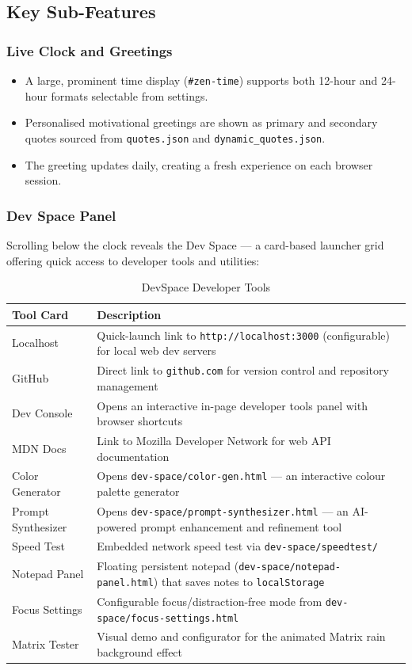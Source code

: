 \subsection{Key Sub-Features}

\subsubsection*{Live Clock and Greetings}
\begin{itemize}[leftmargin=*]
    \item A large, prominent time display (\texttt{\#zen-time}) supports both 12-hour and 24-hour formats selectable from settings.
    \item Personalised motivational greetings are shown as primary and secondary quotes sourced from \texttt{quotes.json} and \texttt{dynamic\_quotes.json}.
    \item The greeting updates daily, creating a fresh experience on each browser session.
\end{itemize}

\subsubsection*{Dev Space Panel}
Scrolling below the clock reveals the Dev Space — a card-based launcher grid offering quick access to developer tools and utilities:
\begin{longtable}{|p{4cm}|p{10cm}|}
\caption{DevSpace Developer Tools} \\
\hline
\textbf{Tool Card} & \textbf{Description} \\ \hline
\endhead
Localhost & Quick-launch link to \texttt{http://localhost:3000} (configurable) for local web dev servers \\ \hline
GitHub & Direct link to \texttt{github.com} for version control and repository management \\ \hline
Dev Console & Opens an interactive in-page developer tools panel with browser shortcuts \\ \hline
MDN Docs & Link to Mozilla Developer Network for web API documentation \\ \hline
Color Generator & Opens \texttt{dev-space/color-gen.html} — an interactive colour palette generator \\ \hline
Prompt Synthesizer & Opens \texttt{dev-space/prompt-synthesizer.html} — an AI-powered prompt enhancement and refinement tool \\ \hline
Speed Test & Embedded network speed test via \texttt{dev-space/speedtest/} \\ \hline
Notepad Panel & Floating persistent notepad (\texttt{dev-space/notepad-panel.html}) that saves notes to \texttt{localStorage} \\ \hline
Focus Settings & Configurable focus/distraction-free mode from \texttt{dev-space/focus-settings.html} \\ \hline
Matrix Tester & Visual demo and configurator for the animated Matrix rain background effect \\ \hline
\end{longtable}

